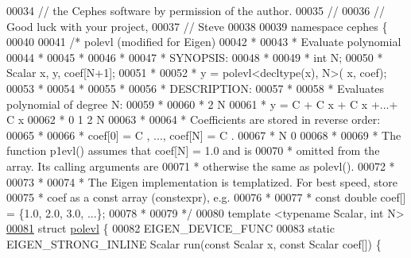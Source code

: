 \begin{DoxyCode}
00034 \textcolor{comment}{//    the Cephes software by permission of the author.}
00035 \textcolor{comment}{//}
00036 \textcolor{comment}{//    Good luck with your project,}
00037 \textcolor{comment}{//    Steve}
00038 
00039 \textcolor{keyword}{namespace }cephes \{
00040 
00041 \textcolor{comment}{/* polevl (modified for Eigen)}
00042 \textcolor{comment}{ *}
00043 \textcolor{comment}{ *      Evaluate polynomial}
00044 \textcolor{comment}{ *}
00045 \textcolor{comment}{ *}
00046 \textcolor{comment}{ *}
00047 \textcolor{comment}{ * SYNOPSIS:}
00048 \textcolor{comment}{ *}
00049 \textcolor{comment}{ * int N;}
00050 \textcolor{comment}{ * Scalar x, y, coef[N+1];}
00051 \textcolor{comment}{ *}
00052 \textcolor{comment}{ * y = polevl<decltype(x), N>( x, coef);}
00053 \textcolor{comment}{ *}
00054 \textcolor{comment}{ *}
00055 \textcolor{comment}{ *}
00056 \textcolor{comment}{ * DESCRIPTION:}
00057 \textcolor{comment}{ *}
00058 \textcolor{comment}{ * Evaluates polynomial of degree N:}
00059 \textcolor{comment}{ *}
00060 \textcolor{comment}{ *                     2          N}
00061 \textcolor{comment}{ * y  =  C  + C x + C x  +...+ C x}
00062 \textcolor{comment}{ *        0    1     2          N}
00063 \textcolor{comment}{ *}
00064 \textcolor{comment}{ * Coefficients are stored in reverse order:}
00065 \textcolor{comment}{ *}
00066 \textcolor{comment}{ * coef[0] = C  , ..., coef[N] = C  .}
00067 \textcolor{comment}{ *            N                   0}
00068 \textcolor{comment}{ *}
00069 \textcolor{comment}{ *  The function p1evl() assumes that coef[N] = 1.0 and is}
00070 \textcolor{comment}{ * omitted from the array.  Its calling arguments are}
00071 \textcolor{comment}{ * otherwise the same as polevl().}
00072 \textcolor{comment}{ *}
00073 \textcolor{comment}{ *}
00074 \textcolor{comment}{ * The Eigen implementation is templatized.  For best speed, store}
00075 \textcolor{comment}{ * coef as a const array (constexpr), e.g.}
00076 \textcolor{comment}{ *}
00077 \textcolor{comment}{ * const double coef[] = \{1.0, 2.0, 3.0, ...\};}
00078 \textcolor{comment}{ *}
00079 \textcolor{comment}{ */}
00080 \textcolor{keyword}{template} <\textcolor{keyword}{typename} Scalar, \textcolor{keywordtype}{int} N>
\hyperlink{struct_eigen_1_1internal_1_1cephes_1_1polevl}{00081} \textcolor{keyword}{struct }\hyperlink{struct_eigen_1_1internal_1_1cephes_1_1polevl}{polevl} \{
00082   EIGEN\_DEVICE\_FUNC
00083   \textcolor{keyword}{static} EIGEN\_STRONG\_INLINE Scalar run(\textcolor{keyword}{const} Scalar x, \textcolor{keyword}{const} Scalar coef[]) \{

\end{DoxyCode}
